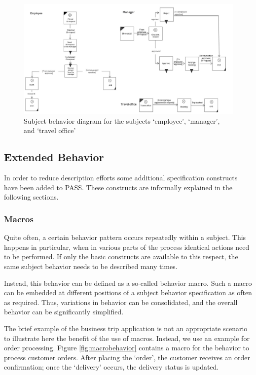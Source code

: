 \begin{landscape}
\begin{figure}[ph]
	\centering
	\includegraphics[width=0.7\linewidth]{20181026-Ontologie-Bilder/Grafiken-Ontologie/SUbjectExecution/Vollst-Beispiel}
	\caption[Subject behavior diagram for the subjects ‘employee’, ‘manager’, and ‘travel office’]{Subject behavior diagram for the subjects ‘employee’, ‘manager’, and ‘travel office’}
	\label{fig:vollst-beispiel}
\end{figure}
\end{landscape}
\newpage




\subsection{Extended Behavior}
In order to reduce description efforts some additional specification constructs have been added to PASS. These constructs are informally explained in the following sections. 

\subsubsection{Macros}
Quite often, a certain behavior pattern occurs repeatedly within a subject. This happens in particular, when in various parts of the process identical actions need to be performed. If only the basic constructs are available to this respect, the same subject behavior needs to be described many times.

Instead, this behavior can be defined as a so-called behavior macro. Such a macro can be embedded at different positions of a subject behavior specification as often as required. Thus, variations in behavior can be consolidated, and the overall behavior can be significantly simplified.

The brief example of the business trip application is not an appropriate scenario to illustrate here the benefit of the use of macros. Instead, we use an example for order processing. Figure \ref{fig:macrobehavior} contains a macro for the behavior to process customer orders. After placing the ‘order’, the customer receives an order confirmation; once the ‘delivery’ occurs, the delivery status is updated.

